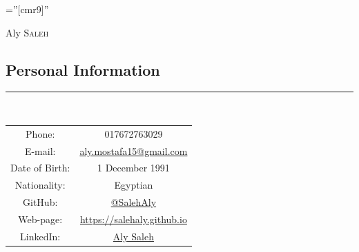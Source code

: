 \documentclass[a4paper,13pt]{article}
\begin{document}
\pagestyle{empty} %

\font\fb=''[cmr9]'' %


\par{\hspace{5cm}\huge Aly \textsc{Saleh}\par} %



\begin{adjustwidth}{-3cm}{}

\section{Personal Information}
\rule[0pt]{20cm}{0.5pt}\\

\begin{center}
	
\begin{tabular}{ c c }

	Phone: & 017672763029\\
	
	E-mail:& \href{mailto:aly.mostafa15@gmail.com}{aly.mostafa15@gmail.com} \\
	
	Date of Birth:& 1 December 1991 \\
	
	Nationality:& Egyptian \\

	GitHub:&  \href{https://github.com/SalehAly}{@SalehAly}\\
	Web-page:& \href{https://salehaly.github.io}{https://salehaly.github.io}\\
	LinkedIn: &\href{https://de.linkedin.com/in/aly-saleh-ba948164}{Aly Saleh}\\

	
\end{tabular}


\end{center}

	\begin{figure}[h]
	

\end{figure}
\end{adjustwidth}
\end{document}
